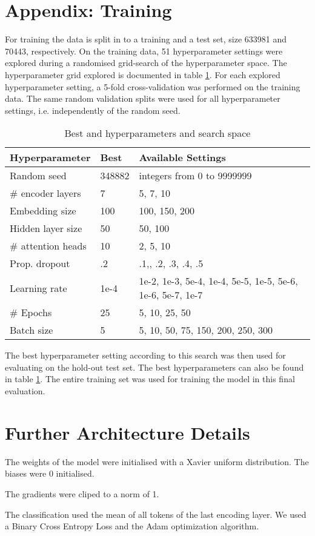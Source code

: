 \documentclass[a4paper]{article}
\begin{document}
\section{Appendix: Training}

For training the data is split in to a training and a test set, size 633981 and 70443, respectively. On the training data, 51 hyperparameter settings were explored during a randomised grid-search of the hyperparameter space. The hyperparameter grid explored is documented in table \ref{tab:hyperparameter_space}. For each explored hyperparameter setting, a 5-fold cross-validation was performed on the training data. The same random validation splits were used for all hyperparameter settings, i.e. independently of the random seed.

\begin{table}[]
    \centering
    \begin{tabular}{lll}
       Hyperparameter  & Best & Available Settings  \\ \hline
       Random seed & 348882 &  integers from 0 to 9999999 \\
       \# encoder layers & 7 & 5, 7, 10 \\
       Embedding size & 100 & 100, 150, 200 \\
       Hidden layer size & 50 & 50, 100 \\
       \# attention heads & 10 & 2, 5, 10 \\
       Prop. dropout & .2 & .1,, .2, .3, .4, .5 \\
       Learning rate & 1e-4 &  1e-2, 1e-3, 5e-4, 1e-4, 5e-5, 1e-5, 5e-6, 1e-6, 5e-7, 1e-7 \\
       \# Epochs & 25 & 5, 10, 25, 50 \\
       Batch size & 5 & 5, 10, 50, 75, 150, 200, 250, 300 \\
    \end{tabular}
    \caption{Best and hyperparameters and search space}
    \label{tab:hyperparameter_space}
\end{table}

The best hyperparameter setting according to this search was then used for evaluating on the hold-out test set. The best hyperparameters can also be found in table \ref{tab:hyperparameter_space}. The entire training set was used for training the model in this final evaluation.


\section{Further Architecture Details}

The weights of the model were initialised with a Xavier uniform
distribution. The biases were 0 initialised.

The gradients were cliped to a norm of 1.

The classification used the mean of all tokens of the last encoding
layer. We used a Binary Cross Entropy Loss and the Adam optimization algorithm.
\end{document}
